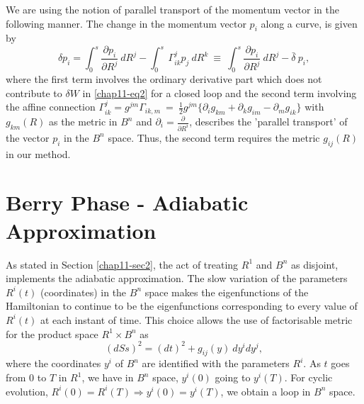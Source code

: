 We are using the notion of parallel transport of the momentum vector in the following manner. The change in the  momentum vector $p_i$ along a curve, is given by 
\setcounter{equation}{3}
\begin{equation}
\delta p_i= \int_0^s \frac{\partial p_i}{\partial R^j}\ dR^j-\int_0^s\ {\Gamma}^j_{ik}p_j\ dR^k\ \equiv\ \int_0^s \frac{\partial p_i}{\partial R^j}\ dR^j-\bar{\delta}\ p_i, \label{chap11-eq4}
\end{equation}
where the first term involves the ordinary derivative part which does not contribute to $\delta W$ in \eqref{chap11-eq2} for  a closed loop and the second term involving the affine connection ${\Gamma}^j_{ik} = g^{jm}{\Gamma}_{ik,m}\  =\ \frac{1}{2}g^{jm}\{{\partial}_ig_{km}+{\partial}_kg_{im}-{\partial}_mg_{ik}\}$ with $g_{km}(R)$ as the metric  in $B^n$ and ${\partial}_i=\frac{\partial}{\partial R^i}$, describes the 'parallel transport' of the vector $p_i$  in the $B^n$ space. Thus, the second term requires the metric $g_{ij}(R)$ in our method.  

\section{Berry Phase - Adiabatic Approximation}\label{chap11-sec3}

As stated in Section \ref{chap11-sec2}, the act of treating $R^1$ and $B^n$ as disjoint, implements the adiabatic approximation.  The slow variation of the parameters $R^i(t)$ (coordinates) in the $B^n$ space makes the eigenfunctions of the  Hamiltonian to continue to be the eigenfunctions corresponding to every value of $R^i(t)$ at each instant of  time. This choice allows the use of factorisable metric for the product space $R^1\times B^n$ as 
\setcounter{equation}{4}
\begin{equation}
(dSs)^2= (dt)^2+g_{ij}(y)\ dy^idy^j,\label{chap11-eq5}
\end{equation}
where the coordinates $y^i$ of $B^n$ are identified with the parameters $R^i$. As $t$ goes from $0$ to $T$ in  $R^1$, we have in $B^n$ space, $y^i(0)$ going to $y^i(T)$. For cyclic evolution, $R^i(0)=R^i(T)\Rightarrow  y^i(0)=y^i(T)$, we obtain a loop in $B^n$ space. 

